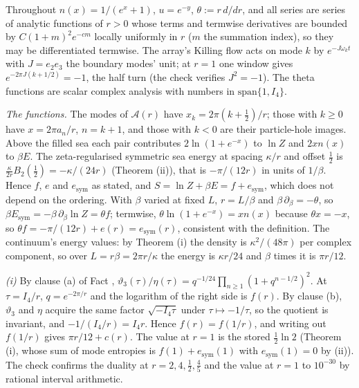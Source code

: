 Throughout $n(x) = 1/(e^{x} + 1)$, $u = e^{-y}$, $\theta := r\,d/dr$, and all series are series of analytic functions of $r > 0$ whose terms and termwise derivatives are bounded by $C(1 + m)^{2}e^{-cm}$ locally uniformly in $r$ ($m$ the summation index), so they may be differentiated termwise. The array's Killing flow acts on mode $k$ by $e^{-J\omega_{k}t}$ with $J = e_{2}e_{3}$ the boundary modes' unit; at $r = 1$ one window gives $e^{-2\pi J(k + 1/2)} = -1$, the half turn (the check verifies $J^{2} = -1$). The theta functions are scalar complex analysis with numbers in $\mathrm{span}\{1, I_4\}$.

\emph{The functions.} The modes of $\mathcal{A}(r)$ have $x_{k} = 2\pi(k + \tfrac12)/r$; those with $k \ge 0$ have $x = 2\pi a_{n}/r$, $n = k + 1$, and those with $k < 0$ are their particle-hole images. Above the filled sea each pair contributes $2\ln(1 + e^{-x})$ to $\ln Z$ and $2xn(x)$ to $\beta E$. The zeta-regularised symmetric sea energy at spacing $\kappa/r$ and offset $\tfrac12$ is $\tfrac{\kappa}{2r}B_{2}(\tfrac12) = -\kappa/(24r)$ (Theorem (ii)), that is $-\pi/(12r)$ in units of $1/\beta$. Hence $f$, $e$ and $e_{\mathrm{sym}}$ as stated, and $S = \ln Z + \beta E = f + e_{\mathrm{sym}}$, which does not depend on the ordering. With $\beta$ varied at fixed $L$, $r = L/\beta$ and $\beta\,\partial_{\beta} = -\theta$, so $\beta E_{\mathrm{sym}} = -\beta\,\partial_{\beta}\ln Z = \theta f$; termwise, $\theta\ln(1 + e^{-x}) = xn(x)$ because $\theta x = -x$, so $\theta f = -\pi/(12r) + e(r) = e_{\mathrm{sym}}(r)$, consistent with the definition. The continuum's energy values: by Theorem (i) the density is $\kappa^{2}/(48\pi)$ per complex component, so over $L = r\beta = 2\pi r/\kappa$ the energy is $\kappa r/24$ and $\beta$ times it is $\pi r/12$.

\emph{(i)} By clause (a) of Fact , $\vartheta_{3}(\tau)/\eta(\tau) = q^{-1/24}\prod_{n \ge 1}(1 + q^{n - 1/2})^{2}$. At $\tau = I_4/r$, $q = e^{-2\pi/r}$ and the logarithm of the right side is $f(r)$. By clause (b), $\vartheta_{3}$ and $\eta$ acquire the same factor $\sqrt{-I_4\tau}$ under $\tau \mapsto -1/\tau$, so the quotient is invariant, and $-1/(I_4/r) = I_4r$. Hence $f(r) = f(1/r)$, and writing out $f(1/r)$ gives $\pi r/12 + c(r)$. The value at $r = 1$ is the stored $\tfrac12\ln 2$ (Theorem (i), whose sum of mode entropies is $f(1) + e_{\mathrm{sym}}(1)$ with $e_{\mathrm{sym}}(1) = 0$ by (ii)). The check confirms the duality at $r = 2, 4, \tfrac12, \tfrac45$ and the value at $r = 1$ to $10^{-30}$ by rational interval arithmetic.

